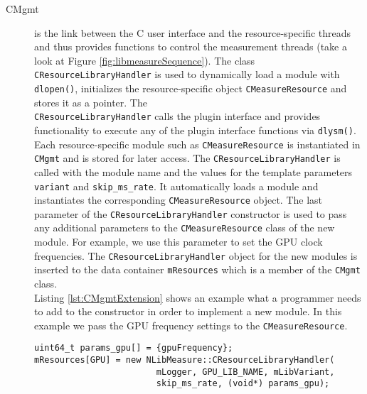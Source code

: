 \begin{description}
\item[CMgmt] is the link between the C user interface and the resource-specific threads and thus provides functions to control the measurement threads (take a look at Figure \ref{fig:libmeasureSequence}). The class \texttt{CResourceLibraryHandler} is used to dynamically load a module with \texttt{dlopen()}, initializes the resource-specific object \texttt{CMeasureResource} and stores it as a pointer. The \\\texttt{CResourceLibraryHandler} calls the plugin interface and provides functionality to execute any of the plugin interface functions via \texttt{dlysm()}. Each resource-specific module such as \texttt{CMeasureResource} is instantiated in \texttt{CMgmt} and is stored for later access. The \texttt{CResourceLibraryHandler} is called with the module name and the values for the template parameters \texttt{variant} and \texttt{skip\_ms\_rate}. It automatically loads a module and instantiates the corresponding \texttt{CMeasureResource} object. The last parameter of the \texttt{CResourceLibraryHandler} constructor is used to pass any additional parameters to the \texttt{CMeasureResource} class of the new module.  For example, we use this parameter to set the GPU clock frequencies. The \texttt{CResourceLibraryHandler} object for the new modules is inserted to the data container \texttt{mResources} which is a member of the \texttt{CMgmt} class.\\
Listing \ref{lst:CMgmtExtension} shows an example what a programmer needs to add to the constructor in order to implement a new module. In this example we pass the GPU frequency settings to the \texttt{CMeasureResource}.
\begin{lstlisting}[caption={Example extension to the \texttt{CMgmt} constructor.}, label=lst:CMgmtExtension]
uint64_t params_gpu[] = {gpuFrequency};
mResources[GPU] = new NLibMeasure::CResourceLibraryHandler(
						mLogger, GPU_LIB_NAME, mLibVariant,
						skip_ms_rate, (void*) params_gpu);
\end{lstlisting}


\end{description}
